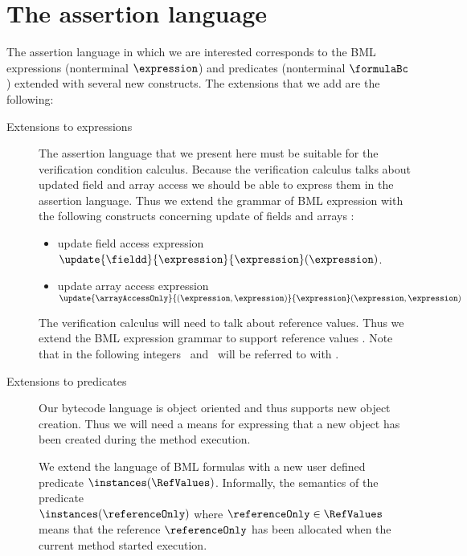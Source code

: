 \section{The assertion language} \label{assertLang:lang}
The assertion language in which we are interested corresponds to the
BML  expressions (nonterminal $\expression$) and predicates 
(nonterminal $\formulaBc$) extended with several new constructs.
 The extensions that we add are the following:
\begin{description}
    \item [Extensions to expressions] 
         The assertion language that we present here must be suitable for the verification condition calculus.
	 Because the verification calculus talks about updated field and array access
	 we should be able  to express  them in the assertion language. Thus we extend the grammar of BML expression
	 with the following constructs concerning update of fields and arrays :

        \begin{itemize}
	       \item update field access expression 
		  $\update{\fieldd}{ \expression}{\expression}(\expression)$.

	       \item update array access expression \\
                   $ \update{ \arrayAccessOnly}{ (\expression , \expression)}{ \expression} (\expression,\expression)$
	\end{itemize}

	The verification calculus will need to talk about reference values. Thus we extend the BML expression grammar to  support
	reference values \RefValues. Note that in the following integers \Myint\  and \RefValues \ will be referred to with \Values.
    \item [Extensions to predicates] Our bytecode language is object oriented and thus supports new object creation. Thus we
          will need a means for expressing that a new object has been created during the method execution. 

	  We extend the language of BML  formulas
	  with a new user defined predicate $ \instances(\RefValues)$. Informally, the semantics of the predicate \\
	  $\instances(\referenceOnly)$ where $\referenceOnly \in \RefValues$
	  means that the reference $\referenceOnly  $  has been allocated when the current method started execution.
        
\end{description}

